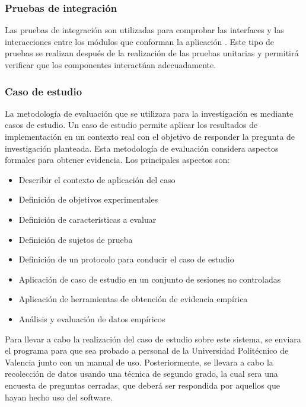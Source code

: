 \documentclass[11pt,letterpaper]{article}
\begin{document}
\subsubsection{Pruebas de integración}
Las pruebas de integración son utilizadas para comprobar las interfaces y las interacciones entre los módulos que conforman la aplicación \cite{Leung1990}. Este tipo de pruebas se realizan después de la realización de las pruebas unitarias y permitirá verificar que los componentes interactúan adecuadamente. 

\subsubsection{Caso de estudio}
La metodología de evaluación \cite{Runeson2009} que se utilizara para la investigación es mediante casos de estudio. Un caso de estudio permite aplicar los resultados de implementación en un contexto real con el objetivo de responder la pregunta de investigación planteada. Esta metodología de evaluación considera aspectos formales para obtener evidencia. Los principales aspectos son:

\begin{itemize}
\item Describir el contexto de aplicación del caso
\item Definición de objetivos experimentales
\item Definición de características a evaluar
\item Definición de sujetos de prueba
\item Definición de un protocolo para conducir el caso de estudio
\item Aplicación de caso de estudio en un conjunto de sesiones no controladas
\item Aplicación de herramientas de obtención de evidencia empírica
\item Análisis y evaluación de datos empíricos
\end{itemize}

Para llevar a cabo la realización del caso de estudio sobre este sistema, se enviara el programa para que sea probado a personal de la Universidad Politécnico de Valencia junto con un manual de uso. Posteriormente, se llevara a cabo la recolección de datos usando una técnica de segundo grado, la cual sera una encuesta de preguntas cerradas, que deberá ser respondida por aquellos que hayan hecho uso del software.
\end{document}
